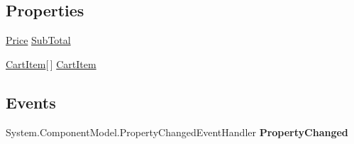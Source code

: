 \subsection*{Properties}
\begin{DoxyCompactItemize}
\item 
\hypertarget{class_price___comparison_1_1amazon_1_1ecs_1_1_cart_items_a94cba2973a6c00b4a7acbe903858662b}{\hyperlink{class_price___comparison_1_1amazon_1_1ecs_1_1_price}{Price} \hyperlink{class_price___comparison_1_1amazon_1_1ecs_1_1_cart_items_a94cba2973a6c00b4a7acbe903858662b}{Sub\-Total}}\label{class_price___comparison_1_1amazon_1_1ecs_1_1_cart_items_a94cba2973a6c00b4a7acbe903858662b}

\begin{DoxyCompactList}\small\item\em \end{DoxyCompactList}\item 
\hypertarget{class_price___comparison_1_1amazon_1_1ecs_1_1_cart_items_a35cf1d95b283ea874a7951f9f19c36db}{\hyperlink{class_price___comparison_1_1amazon_1_1ecs_1_1_cart_item}{Cart\-Item}\mbox{[}$\,$\mbox{]} \hyperlink{class_price___comparison_1_1amazon_1_1ecs_1_1_cart_items_a35cf1d95b283ea874a7951f9f19c36db}{Cart\-Item}}\label{class_price___comparison_1_1amazon_1_1ecs_1_1_cart_items_a35cf1d95b283ea874a7951f9f19c36db}

\begin{DoxyCompactList}\small\item\em \end{DoxyCompactList}\end{DoxyCompactItemize}
\subsection*{Events}
\begin{DoxyCompactItemize}
\item 
\hypertarget{class_price___comparison_1_1amazon_1_1ecs_1_1_cart_items_a82d1e0876946f489ec0b3467e62ae0b6}{System.\-Component\-Model.\-Property\-Changed\-Event\-Handler {\bfseries Property\-Changed}}\label{class_price___comparison_1_1amazon_1_1ecs_1_1_cart_items_a82d1e0876946f489ec0b3467e62ae0b6}

\end{DoxyCompactItemize}
